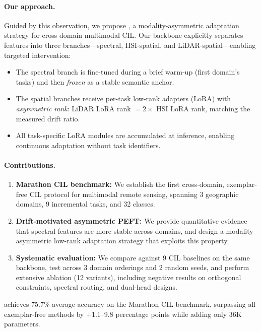 \paragraph{Our approach.}
Guided by this observation, we propose \methodname{}, a modality-asymmetric adaptation strategy for cross-domain multimodal CIL. Our \backbonename{} backbone explicitly separates features into three branches---spectral, HSI-spatial, and LiDAR-spatial---enabling targeted intervention:
\begin{itemize}
    \item The spectral branch is fine-tuned during a brief warm-up (first domain's tasks) and then \emph{frozen} as a stable semantic anchor.
    \item The spatial branches receive per-task low-rank adapters (LoRA) with \emph{asymmetric rank}: LiDAR LoRA rank $= 2\times$ HSI LoRA rank, matching the measured drift ratio.
    \item All task-specific LoRA modules are accumulated at inference, enabling continuous adaptation without task identifiers.
\end{itemize}

\paragraph{Contributions.}
\begin{enumerate}
    \item \textbf{Marathon CIL benchmark:} We establish the first cross-domain, exemplar-free CIL protocol for multimodal remote sensing, spanning 3 geographic domains, 9 incremental tasks, and 32 classes.
    \item \textbf{Drift-motivated asymmetric PEFT:} We provide quantitative evidence that spectral features are more stable across domains, and design a modality-asymmetric low-rank adaptation strategy that exploits this property.
    \item \textbf{Systematic evaluation:} We compare against 9 CIL baselines on the same backbone, test across 3 domain orderings and 2 random seeds, and perform extensive ablation (12 variants), including negative results on orthogonal constraints, spectral routing, and dual-head designs.
\end{enumerate}

\methodname{} achieves 75.7\% average accuracy on the Marathon CIL benchmark, surpassing all exemplar-free methods by +1.1--9.8 percentage points while adding only 36K parameters.
